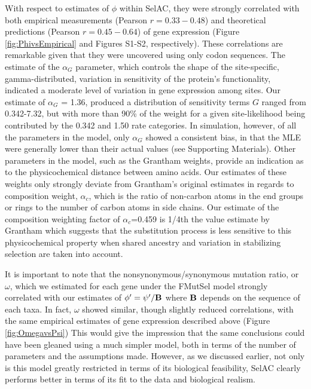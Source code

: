 \documentclass[onecolumn,letterpaper,fleqn,nogrid]{myMBE}%
\newcommand{\Func}{\ensuremath{\text{\textbf{B}}}\xspace}
\newcommand{\selac}{SelAC\xspace}
\newcommand{\alphac}{\ensuremath{\alpha_c}\xspace}
\newcommand{\alphag}{\ensuremath{\alpha_G}\xspace}
\newcommand{\phiprime}{\ensuremath{\phi'}\xspace}
\newcommand{\psiprime}{\ensuremath{\psi'}\xspace}
\begin{document}
With respect to estimates of $\phi$ within \selac, they were strongly correlated with both empirical measurements (Pearson $r = 0.33-0.48$) and theoretical predictions (Pearson $r = 0.45-0.64$) of gene expression (Figure \ref{fig:PhivsEmpirical} and Figures S1-S2, respectively).
These correlations are remarkable given that they were uncovered using only codon sequences.
The estimate of the $\alphag$ parameter, which controls the shape of the site-specific, gamma-distributed, variation in sensitivity of the protein's functionality, indicated a moderate level of variation in gene expression among sites.
Our estimate of $\alphag$ = 1.36, produced a distribution of sensitivity terms $G$ ranged from 0.342-7.32, but with more than 90\% of the weight for a given site-likelihood being contributed by the 0.342 and 1.50 rate categories.
In simulation, however, of all the parameters in the model, only $\alphag$ showed a consistent bias, in that the MLE were generally lower than their actual values (see Supporting Materials).
Other parameters in the model, such as the Grantham weights, provide an indication as to the physicochemical distance between amino acids.
Our estimates of these weights only strongly deviate from Grantham's \citeyear{Grantham1974} original estimates in regards to composition weight, $\alphac$, which is the ratio of non-carbon atoms in the end groups or rings to the number of carbon atoms in side chains.
Our estimate of the composition weighting factor of $\alphac$=0.459 is 1/4th the value estimate by Grantham which suggests that the substitution process is less sensitive to this physicochemical property when shared ancestry and variation in stabilizing selection are taken into account.

It is important to note that the nonsynonymous/synonymous mutation ratio, or $\omega$, which we estimated for each gene under the FMutSel model strongly correlated with our estimates of $\phiprime = \psiprime/\Func$ where $\Func$ depends on the sequence of each taxa.
In fact, $\omega$ showed similar, though slightly reduced correlations, with the same empirical estimates of gene expression described above (Figure \ref{fig:OmegavsPsi})
This would give the impression that the same conclusions could have been gleaned using a much simpler model, both in terms of the number of parameters and the assumptions made.
However, as we discussed earlier, not only is this model greatly restricted in terms of its biological feasibility, \selac clearly performs better in terms of its fit to the data and biological realism.
\end{document}

